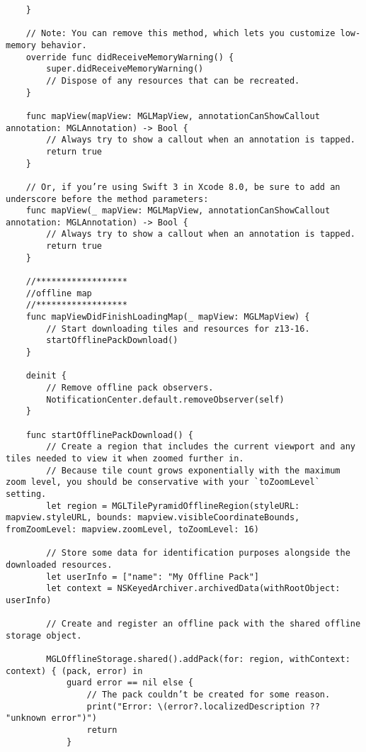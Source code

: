 \documentclass[letterpaper, 10pt,titlepage]{article}
\begin{document}
\begin{verbatim}
    }
    
    // Note: You can remove this method, which lets you customize low-memory behavior.
    override func didReceiveMemoryWarning() {
        super.didReceiveMemoryWarning()
        // Dispose of any resources that can be recreated.
    }

    func mapView(mapView: MGLMapView, annotationCanShowCallout annotation: MGLAnnotation) -> Bool {
        // Always try to show a callout when an annotation is tapped.
        return true
    }
    
    // Or, if you’re using Swift 3 in Xcode 8.0, be sure to add an underscore before the method parameters:
    func mapView(_ mapView: MGLMapView, annotationCanShowCallout annotation: MGLAnnotation) -> Bool {
        // Always try to show a callout when an annotation is tapped.
        return true
    }
    
    //******************
    //offline map
    //******************
    func mapViewDidFinishLoadingMap(_ mapView: MGLMapView) {
        // Start downloading tiles and resources for z13-16.
        startOfflinePackDownload()
    }
    
    deinit {
        // Remove offline pack observers.
        NotificationCenter.default.removeObserver(self)
    }
    
    func startOfflinePackDownload() {
        // Create a region that includes the current viewport and any tiles needed to view it when zoomed further in.
        // Because tile count grows exponentially with the maximum zoom level, you should be conservative with your `toZoomLevel` setting.
        let region = MGLTilePyramidOfflineRegion(styleURL: mapview.styleURL, bounds: mapview.visibleCoordinateBounds, fromZoomLevel: mapview.zoomLevel, toZoomLevel: 16)
        
        // Store some data for identification purposes alongside the downloaded resources.
        let userInfo = ["name": "My Offline Pack"]
        let context = NSKeyedArchiver.archivedData(withRootObject: userInfo)
        
        // Create and register an offline pack with the shared offline storage object.
        
        MGLOfflineStorage.shared().addPack(for: region, withContext: context) { (pack, error) in
            guard error == nil else {
                // The pack couldn’t be created for some reason.
                print("Error: \(error?.localizedDescription ?? "unknown error")")
                return
            }
            

\end{verbatim}
\end{document}
